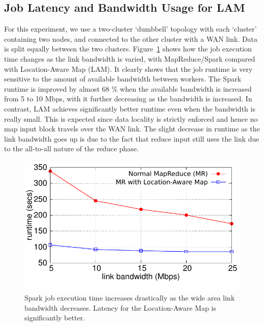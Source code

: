 \subsection{Job Latency and Bandwidth Usage for LAM}
For this experiment, we use a two-cluster `dumbbell' topology with each `cluster' containing two nodes, and
connected to the other cluster with a WAN link. Data is split equally between the two clusters. 
Figure~\ref{fig:job-time-localMap} shows how the job execution time changes as the link bandwidth is varied,  %
with MapReduce/Spark  compared with Location-Aware Map (LAM). 
It clearly shows that the job runtime is very sensitive to the amount of available bandwidth between workers. The Spark runtime is improved by almost 68 \% when the available bandwidth is increased from 5 to 10 Mbps, with it further decreasing as the bandwidth is increased.  
In contrast, LAM achieves significantly better runtime even when the bandwidth is really small. This is expected since data locality is strictly enforced and hence no map input block travels over the WAN link. 
The slight decrease in runtime as the link bandwidth goes up is due to the fact that reduce input still
uses the link due to the all-to-all nature of the reduce phase. 

\begin{figure}[!ht]
\centering\includegraphics[width=\columnwidth]{figs/job-time-localMap.pdf}
\vspace{-1.2em}
\caption{Spark job execution time increases drastically as the wide area link bandwidth decreases. Latency 
for the Location-Aware Map is significantly better.}
\label{fig:job-time-localMap}
\vspace{.7em}
\end{figure}

